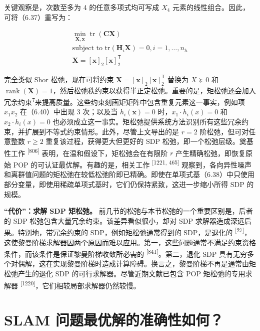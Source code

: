 关键观察是，次数至多为 4 的任意多项式均可写成 $X_4$ 元素的线性组合。因此，可将（6.37）重写为：

\begin{equation}
\begin{array}{c} \underset {\boldsymbol {X}, \boldsymbol {x}} {\min} \operatorname{tr} (\boldsymbol {C X}) \\ \text {subject to tr} (\boldsymbol {H} _ {i} \boldsymbol {X}) = 0, i = 1, \ldots , n _ {h} \\ \boldsymbol {X} = [ \boldsymbol {x} ] _ {2} [ \boldsymbol {x} ] _ {2} ^ {\mathsf {T}} \end{array}\tag{6.40}
\end{equation}

完全类似 Shor 松弛，现在可将约束 $\boldsymbol { X } = [ \pmb x ] _ { 2 } [ \pmb x ] _ { 2 } ^ { \mathsf { T } }$ 替换为 $X \succeq 0$ 和 $\operatorname{rank} ( \pmb { X } ) = 1$，然后松弛秩约束以获得半正定松弛。重要的是，矩松弛还会加入冗余约束\textsuperscript{7}来提高质量。这些约束刻画矩矩阵中包含重复元素这一事实，例如项 $x_1x_2$ 在（6.40）中出现 3 次；以及当 $h _ { i } ( \pmb x ) = 0$ 时，$x _ { 1 } \cdot h _ { i } ( x ) = 0$ 和 $x _ { 2 } \cdot h _ { i } ( x ) = 0$ 也必须成立这一事实。矩松弛提供系统方法识别所有这些冗余约束，并扩展到不等式约束情形。此外，尽管上文导出的是 $r = 2$ 阶松弛，但可对任意整数 $r \geq 2$ 重复该过程，获得更大但更好的 SDP 松弛，即一个松弛层级。奠基性工作 \textsuperscript{[806]} 表明，在温和假设下，矩松弛会在有限阶 $r$ 产生精确松弛，即恢复原始 POP 的可认证最优解。有趣的是，相关工作 \textsuperscript{[1221, 465]} 观察到，各向异性噪声和离群值问题的矩松弛在较低松弛阶即已精确。即使在单项式基（6.38）中只使用部分变量，即使用稀疏单项式基时，它们仍保持紧致，这进一步缩小所得 SDP 的规模。

\textbf{“代价”：求解 SDP 矩松弛。} 前几节的松弛与本节松弛的一个重要区别是，后者的 SDP 松弛包含大量冗余约束。该差异看似很小，却对 SDP 求解器造成深远后果。特别地，带冗余约束的 SDP，例如矩松弛通常得到的 SDP，是退化的 \textsuperscript{[27]}，这使黎曼阶梯求解器因两个原因而难以应用。第一，这些问题通常不满足约束资格条件，而该条件是保证黎曼阶梯收敛所必需的 \textsuperscript{[841]}。第二，退化 SDP 具有无穷多个对偶解，这在实现黎曼阶梯时造成计算障碍。换言之，黎曼阶梯不再是通常由矩松弛产生的退化 SDP 的可行求解器。尽管近期文献已包含 POP 矩松弛的专用求解器 \textsuperscript{[1220]}，它们相较局部求解器仍然较慢。

\section{SLAM 问题最优解的准确性如何？}

